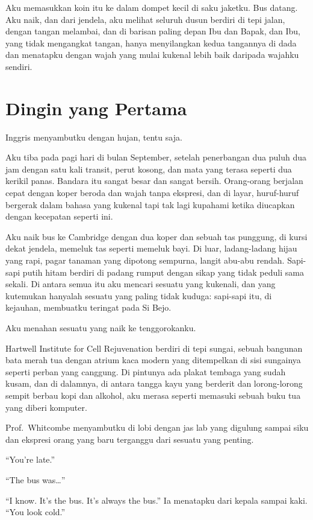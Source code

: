 \documentclass[11pt,twoside,openany]{book}
\makeatletter
\newcommand{\scenebreak}{\par\vspace{0.9em}{\centering\textsc{*\hspace{0.7em}*\hspace{0.7em}*}\par}\vspace{0.9em}\@afterindentfalse\@afterheading}
\makeatother
\begin{document}
Aku memasukkan koin itu ke dalam dompet kecil di saku jaketku. Bus datang. Aku naik, dan dari jendela, aku melihat seluruh dusun berdiri di tepi jalan, dengan tangan melambai, dan di barisan paling depan Ibu dan Bapak, dan Ibu, yang tidak mengangkat tangan, hanya menyilangkan kedua tangannya di dada dan menatapku dengan wajah yang mulai kukenal lebih baik daripada wajahku sendiri.

\chapter{Dingin yang Pertama}
Inggris menyambutku dengan hujan, tentu saja.

Aku tiba pada pagi hari di bulan September, setelah penerbangan dua puluh dua jam dengan satu kali transit, perut kosong, dan mata yang terasa seperti dua kerikil panas. Bandara itu sangat besar dan sangat bersih. Orang-orang berjalan cepat dengan koper beroda dan wajah tanpa ekspresi, dan di layar, huruf-huruf bergerak dalam bahasa yang kukenal tapi tak lagi kupahami ketika diucapkan dengan kecepatan seperti ini.

Aku naik bus ke Cambridge dengan dua koper dan sebuah tas punggung, di kursi dekat jendela, memeluk tas seperti memeluk bayi. Di luar, ladang-ladang hijau yang rapi, pagar tanaman yang dipotong sempurna, langit abu-abu rendah. Sapi-sapi putih hitam berdiri di padang rumput dengan sikap yang tidak peduli sama sekali. Di antara semua itu aku mencari sesuatu yang kukenali, dan yang kutemukan hanyalah sesuatu yang paling tidak kuduga: sapi-sapi itu, di kejauhan, membuatku teringat pada Si Bejo.

Aku menahan sesuatu yang naik ke tenggorokanku.

\scenebreak
Hartwell Institute for Cell Rejuvenation berdiri di tepi sungai, sebuah bangunan bata merah tua dengan atrium kaca modern yang ditempelkan di sisi sungainya seperti perban yang canggung. Di pintunya ada plakat tembaga yang sudah kusam, dan di dalamnya, di antara tangga kayu yang berderit dan lorong-lorong sempit berbau kopi dan alkohol, aku merasa seperti memasuki sebuah buku tua yang diberi komputer.

Prof.~Whitcombe menyambutku di lobi dengan jas lab yang digulung sampai siku dan ekspresi orang yang baru terganggu dari sesuatu yang penting.

``You're late.''

``The bus was\ldots{}''

``I know. It's the bus. It's always the bus.'' Ia menatapku dari kepala sampai kaki. ``You look cold.''
\end{document}
